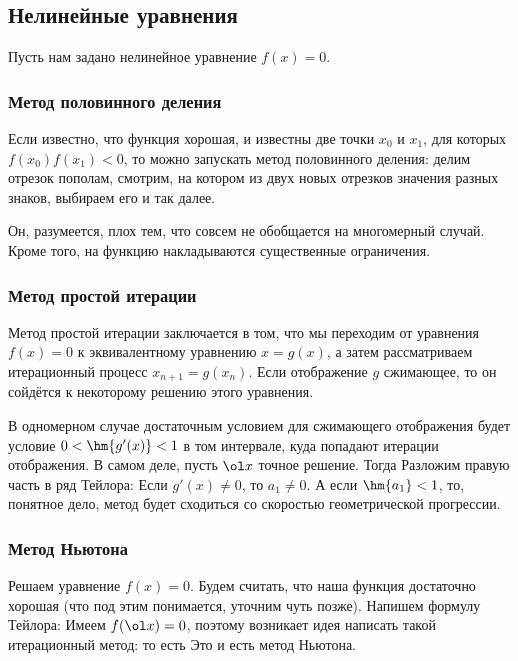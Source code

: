 \documentclass[a4paper]{article}
\begin{document}
\subsection{Нелинейные уравнения}

Пусть нам задано нелинейное уравнение $f(x) = 0$.

\subsubsection{Метод половинного деления}

Если известно, что функция хорошая, и известны две точки $x_0$ и
$x_1$, для которых $f(x_0) f(x_1) < 0$, то можно запускать метод
половинного деления: делим отрезок пополам, смотрим, на котором из
двух новых отрезков значения разных знаков, выбираем его и так далее.

Он, разумеется, плох тем, что совсем не обобщается на многомерный
случай.  Кроме того, на функцию накладываются существенные
ограничения.

\subsubsection{Метод простой итерации}

Метод простой итерации заключается в том, что мы переходим от
уравнения $f(x) = 0$ к эквивалентному уравнению $x = g(x)$, а затем
рассматриваем итерационный процесс $x_{n+1} = g(x_n)$.  Если
отображение $g$ сжимающее, то он сойдётся к некоторому решению этого
уравнения.

В одномерном случае достаточным условием для сжимающего отображения
будет условие $0 < \hm{g'(x)} < 1$ в том интервале, куда попадают
итерации отображения.  В самом деле, пусть $\ol x$ точное
решение. Тогда   Разложим правую часть в ряд Тейлора:  Если $g'(x) \ne
0$, то $a_1 \ne 0$. А если $\hm{a_1} < 1$, то, понятное дело, метод
будет сходиться со скоростью геометрической прогрессии.

\subsubsection{Метод Ньютона}

Решаем уравнение $f(x) = 0$.  Будем считать, что наша функция
достаточно хорошая (что под этим понимается, уточним чуть позже).
Напишем формулу Тейлора:   Имеем $f(\ol x) = 0$, поэтому возникает идея
написать такой итерационный метод:  то есть   Это
и есть метод Ньютона.
\end{document}
